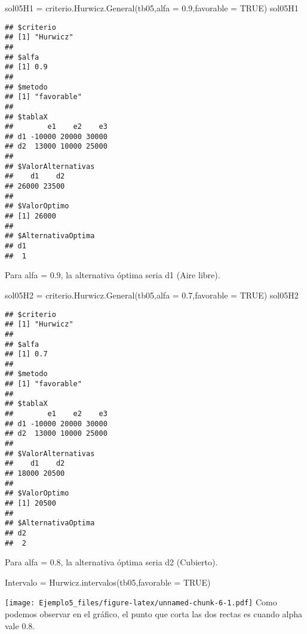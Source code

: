 \documentclass[
]{article}
\newenvironment{Shaded}{\begin{snugshade}}{\end{snugshade}}
\newcommand{\AttributeTok}[1]{\textcolor[rgb]{0.77,0.63,0.00}{#1}}
\newcommand{\ConstantTok}[1]{\textcolor[rgb]{0.00,0.00,0.00}{#1}}
\newcommand{\FloatTok}[1]{\textcolor[rgb]{0.00,0.00,0.81}{#1}}
\newcommand{\FunctionTok}[1]{\textcolor[rgb]{0.00,0.00,0.00}{#1}}
\newcommand{\NormalTok}[1]{#1}
\newcommand{\OtherTok}[1]{\textcolor[rgb]{0.56,0.35,0.01}{#1}}
\begin{document}
\begin{Shaded}
\begin{Highlighting}[]
\NormalTok{sol05H1 }\OtherTok{=} \FunctionTok{criterio.Hurwicz.General}\NormalTok{(tb05,}\AttributeTok{alfa =} \FloatTok{0.9}\NormalTok{,}\AttributeTok{favorable =} \ConstantTok{TRUE}\NormalTok{)}
\NormalTok{sol05H1}
\end{Highlighting}
\end{Shaded}

\begin{verbatim}
## $criterio
## [1] "Hurwicz"
## 
## $alfa
## [1] 0.9
## 
## $metodo
## [1] "favorable"
## 
## $tablaX
##        e1    e2    e3
## d1 -10000 20000 30000
## d2  13000 10000 25000
## 
## $ValorAlternativas
##    d1    d2 
## 26000 23500 
## 
## $ValorOptimo
## [1] 26000
## 
## $AlternativaOptima
## d1 
##  1
\end{verbatim}

Para alfa = 0.9, la alternativa óptima seria d1 (Aire libre).

\begin{Shaded}
\begin{Highlighting}[]
\NormalTok{sol05H2 }\OtherTok{=} \FunctionTok{criterio.Hurwicz.General}\NormalTok{(tb05,}\AttributeTok{alfa =} \FloatTok{0.7}\NormalTok{,}\AttributeTok{favorable =} \ConstantTok{TRUE}\NormalTok{)}
\NormalTok{sol05H2}
\end{Highlighting}
\end{Shaded}

\begin{verbatim}
## $criterio
## [1] "Hurwicz"
## 
## $alfa
## [1] 0.7
## 
## $metodo
## [1] "favorable"
## 
## $tablaX
##        e1    e2    e3
## d1 -10000 20000 30000
## d2  13000 10000 25000
## 
## $ValorAlternativas
##    d1    d2 
## 18000 20500 
## 
## $ValorOptimo
## [1] 20500
## 
## $AlternativaOptima
## d2 
##  2
\end{verbatim}

Para alfa = 0.8, la alternativa óptima seria d2 (Cubierto).

\begin{Shaded}
\begin{Highlighting}[]
\NormalTok{Intervalo }\OtherTok{=} \FunctionTok{Hurwicz.intervalos}\NormalTok{(tb05,}\AttributeTok{favorable =} \ConstantTok{TRUE}\NormalTok{)}
\end{Highlighting}
\end{Shaded}

\texttt{[image: Ejemplo5\_files/figure-latex/unnamed-chunk-6-1.pdf]} Como
podemos observar en el gráfico, el punto que corta las dos rectas es
cuando alpha vale 0.8.
\end{document}
